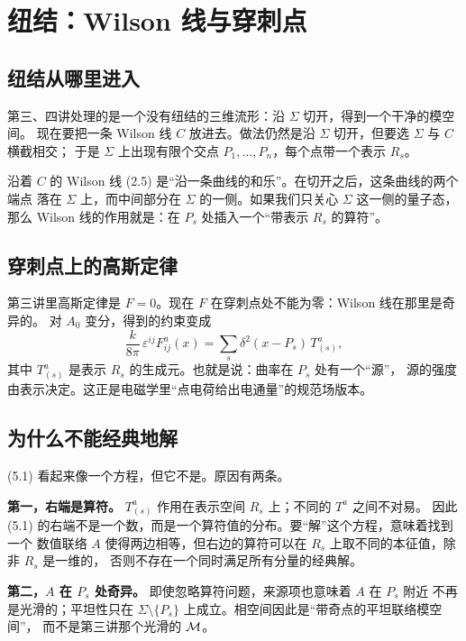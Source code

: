 \section{纽结：Wilson 线与穿刺点}

\subsection{纽结从哪里进入}

第三、四讲处理的是一个没有纽结的三维流形：沿 $\Sigma$ 切开，得到一个干净的模空间。
现在要把一条 Wilson 线 $C$ 放进去。做法仍然是沿 $\Sigma$ 切开，但要选 $\Sigma$ 与 $C$ 横截相交；
于是 $\Sigma$ 上出现有限个交点 $P_1,\dots,P_n$，每个点带一个表示 $R_s$。

沿着 $C$ 的 Wilson 线 (2.5) 是“沿一条曲线的和乐”。在切开之后，这条曲线的两个端点
落在 $\Sigma$ 上，而中间部分在 $\Sigma$ 的一侧。如果我们只关心 $\Sigma$ 这一侧的量子态，
那么 Wilson 线的作用就是：在 $P_s$ 处插入一个“带表示 $R_s$ 的算符”。

\subsection{穿刺点上的高斯定律}

第三讲里高斯定律是 $F=0$。现在 $F$ 在穿刺点处不能为零：Wilson 线在那里是奇异的。
对 $A_0$ 变分，得到的约束变成
\begin{equation}
\frac{k}{8\pi}\,\varepsilon^{ij}F^a_{ij}(x)=\sum_s\delta^2(x-P_s)\,T^a_{(s)}, \tag{5.1}
\end{equation}
其中 $T^a_{(s)}$ 是表示 $R_s$ 的生成元。也就是说：曲率在 $P_s$ 处有一个“源”，
源的强度由表示决定。这正是电磁学里“点电荷给出电通量”的规范场版本。

\subsection{为什么不能经典地解}

(5.1) 看起来像一个方程，但它不是。原因有两条。

\textbf{第一，右端是算符。} $T^a_{(s)}$ 作用在表示空间 $R_s$ 上；不同的 $T^a$ 之间不对易。
因此 (5.1) 的右端不是一个数，而是一个算符值的分布。要“解”这个方程，意味着找到一个
数值联络 $A$ 使得两边相等，但右边的算符可以在 $R_s$ 上取不同的本征值，除非 $R_s$ 是一维的，
否则不存在一个同时满足所有分量的经典解。

\textbf{第二，$A$ 在 $P_s$ 处奇异。} 即使忽略算符问题，来源项也意味着 $A$ 在 $P_s$ 附近
不再是光滑的；平坦性只在 $\Sigma\setminus\{P_s\}$ 上成立。相空间因此是“带奇点的平坦联络模空间”，
而不是第三讲那个光滑的 $\mathcal{M}$。

